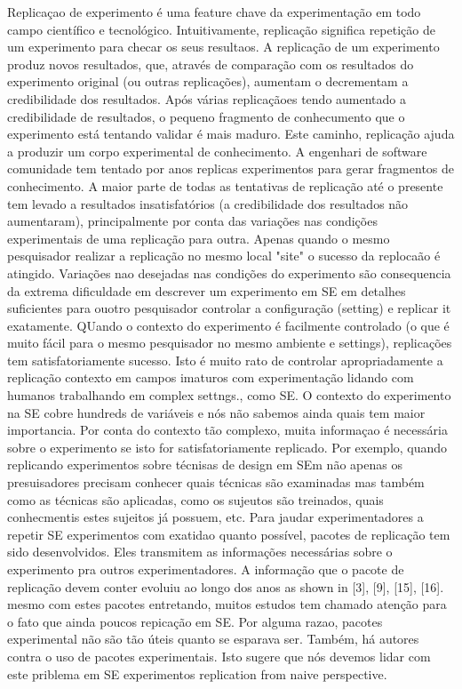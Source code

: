Replicaçao de experimento é uma feature chave da experimentação em todo
campo científico e tecnológico. Intuitivamente, replicação significa repetição de um experimento
para checar os seus resultaos. A replicação de um experimento produz novos resultados,
que, através de comparação com os resultados do experimento original (ou outras replicações),
aumentam o decrementam a credibilidade dos resultados. Após várias replicaçãoes tendo
aumentado a credibilidade de resultados, o pequeno fragmento de conhecumento que
o experimento está tentando validar é mais maduro. Este caminho, replicação ajuda a produzir
um corpo experimental de conhecimento. A engenhari de software comunidade tem tentado por anos
replicas experimentos para gerar fragmentos de conhecimento.
A maior parte de todas as tentativas de replicação até o presente
tem levado a resultados insatisfatórios (a credibilidade dos resultados não aumentaram),
principalmente por conta das variações nas condições experimentais de uma replicação para outra.
Apenas quando o mesmo pesquisador realizar a replicação no mesmo local "site" o sucesso
da replocaão é atingido. Variações nao desejadas nas condições do experimento são consequencia
da extrema dificuldade em descrever um experimento em SE em detalhes suficientes para ouotro
pesquisador controlar a configuração (setting) e replicar it exatamente. QUando
o contexto do experimento é facilmente controlado (o que é muito fácil para o mesmo pesquisador
no mesmo ambiente e settings), replicações tem satisfatoriamente sucesso.
Isto é muito rato de controlar apropriadamente a replicação contexto em campos imaturos com experimentação
lidando com humanos trabalhando em complex settngs., como SE. O contexto do experimento na SE cobre hundreds de variáveis
e nós não sabemos ainda quais tem maior importancia.
Por conta do contexto tão complexo, muita informaçao é necessária sobre o experimento se
isto for satisfatoriamente replicado. Por exemplo, quando replicando experimentos sobre técnisas de 
design em SEm não apenas os presuisadores precisam conhecer quais técnicas são examinadas
mas também como as técnicas são aplicadas, como os sujeutos são treinados, quais conhecmentis
estes sujeitos já possuem, etc.
Para jaudar experimentadores a repetir SE experimentos com exatidao quanto possível,
pacotes de replicação tem sido desenvolvidos. Eles transmitem as informações necessárias sobre o
experimento pra outros experimentadores. A informação que o pacote de replicação devem conter
evoluiu ao longo dos anos as shown in [3], [9], [15], [16]. mesmo com estes pacotes
entretando, muitos estudos tem chamado atenção para o fato que ainda poucos repicação em SE.
Por alguma razao, pacotes experimental não são tão úteis quanto se esparava ser.
Também, há autores contra o uso de pacotes experimentais. Isto sugere que nós devemos lidar com este priblema
em SE experimentos replication from naive perspective.
\cite{juristo_using_2009}

